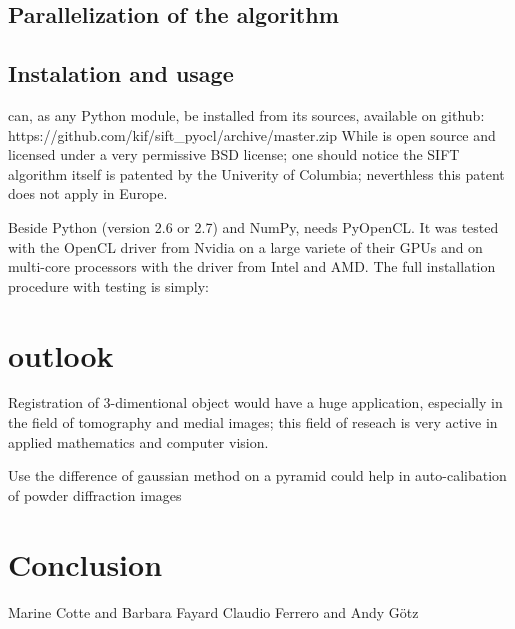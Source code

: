 \documentclass[preprint]{iucr}
\begin{document}
\subsection{Parallelization of the algorithm}

\subsection{Instalation and usage}
 can, as any Python module, be installed from its sources,
available on github:
https://github.com/kif/sift_pyocl/archive/master.zip 
While  is open source and licensed under a very
permissive BSD license; one should notice the SIFT algorithm itself is
patented by the Univerity of Columbia\cite{SIFT}; neverthless this patent does
not apply in Europe.

Beside Python (version 2.6 or 2.7) and NumPy,  needs
PyOpenCL\cite{pyopencl}.
It was tested with the OpenCL\cite{opencl} driver from Nvidia on a
large variete of their GPUs and on multi-core processors with the driver from
Intel and AMD. The full installation procedure with testing is simply:



\section{outlook}

Registration of 3-dimentional object would have a huge application, especially
in the field of tomography and medial images; this field of reseach is very
active in applied mathematics and computer vision.

Use the difference of gaussian method on a pyramid could help in auto-calibation
of powder diffraction images 

\section{Conclusion}


Marine Cotte and Barbara Fayard
Claudio Ferrero and Andy G\"otz



\end{document}
